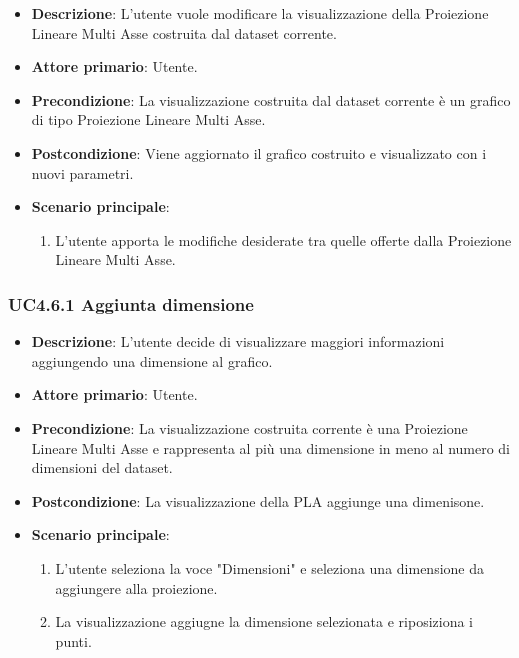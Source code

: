 \begin{itemize}
    \item \textbf{Descrizione}: L’utente vuole modificare la visualizzazione della Proiezione Lineare Multi Asse
                                costruita dal dataset corrente.
	
    \item \textbf{Attore primario}: Utente.
    
    \item \textbf{Precondizione}:   La visualizzazione costruita dal dataset corrente è un grafico di tipo Proiezione Lineare Multi Asse.
    \item \textbf{Postcondizione}:  Viene aggiornato il grafico costruito e visualizzato con i nuovi parametri.

	\item \textbf{Scenario principale}:
		\begin{enumerate}
            \item L'utente apporta le modifiche desiderate tra quelle offerte dalla Proiezione Lineare Multi Asse.
        \end{enumerate}
\end{itemize}

\subsubsection{UC4.6.1 Aggiunta dimensione}
\label{ssub:uc4.6.1}
\begin{itemize}
    \item \textbf{Descrizione}: L’utente decide di visualizzare maggiori informazioni
                                aggiungendo una dimensione al grafico.

    \item \textbf{Attore primario}: Utente.
    
    \item \textbf{Precondizione}:   La visualizzazione costruita corrente è una Proiezione Lineare Multi Asse
                                    e rappresenta al più una dimensione in meno al numero di dimensioni del dataset.
    \item \textbf{Postcondizione}:  La visualizzazione della PLA aggiunge una dimenisone.

	\item \textbf{Scenario principale}:
        \begin{enumerate}
            \item L'utente seleziona la voce "Dimensioni" e seleziona una dimensione da aggiungere alla proiezione.
            \item La visualizzazione aggiugne la dimensione selezionata e riposiziona i punti.
           
        \end{enumerate}
\end{itemize}

